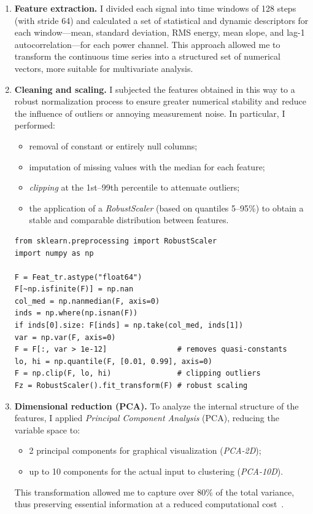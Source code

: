 \begin{enumerate}
  \item \textbf{Feature extraction.}  
  I divided each signal into time windows of 128 steps (with stride 64) and calculated a set of statistical and dynamic descriptors for each window—mean, standard deviation, RMS energy, mean slope, and lag-1 autocorrelation—for each power channel.  
  This approach allowed me to transform the continuous time series into a structured set of numerical vectors, more suitable for multivariate analysis.

  \item \textbf{Cleaning and scaling.}  
  I subjected the features obtained in this way to a robust normalization process to ensure greater numerical stability and reduce the influence of outliers or annoying measurement noise.  
  In particular, I performed:
  \begin{itemize}
      \item removal of constant or entirely null columns;
      \item imputation of missing values with the median for each feature;
      \item \emph{clipping} at the 1st–99th percentile to attenuate outliers;
      \item the application of a \emph{RobustScaler} (based on quantiles 5–95\%) to obtain a stable and comparable distribution between features.
  \end{itemize}

\begin{listing}[H]
\begin{verbatim}
from sklearn.preprocessing import RobustScaler
import numpy as np

F = Feat_tr.astype("float64")
F[~np.isfinite(F)] = np.nan
col_med = np.nanmedian(F, axis=0)
inds = np.where(np.isnan(F))
if inds[0].size: F[inds] = np.take(col_med, inds[1])
var = np.var(F, axis=0)
F = F[:, var > 1e-12]                # removes quasi-constants
lo, hi = np.quantile(F, [0.01, 0.99], axis=0)
F = np.clip(F, lo, hi)               # clipping outliers
Fz = RobustScaler().fit_transform(F) # robust scaling
\end{verbatim}
\end{listing}

  \item \textbf{Dimensional reduction (PCA).}  
  To analyze the internal structure of the features, I applied \emph{Principal Component Analysis} (PCA), reducing the variable space to:
  \begin{itemize}
      \item 2 principal components for graphical visualization (\emph{PCA-2D});
      \item up to 10 components for the actual input to clustering (\emph{PCA-10D}).
  \end{itemize}
  This transformation allowed me to capture over 80\% of the total variance, thus preserving essential information at a reduced computational cost~\cite{jolliffe2002pca}.


\end{enumerate}
